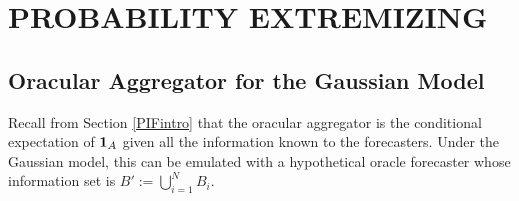 \documentclass[12pt]{article}
\theoremstyle{definition}
\theoremstyle{definition}
\def\one{{\bf 1}}
\begin{document}
%

\section{PROBABILITY EXTREMIZING}
\label{extremizing}
\subsection{Oracular Aggregator for the Gaussian Model}
\label{oracular}
Recall from Section \ref{PIFintro} that the oracular aggregator is the
conditional expectation of $\one_A$ given all the information known to the
forecasters. Under the Gaussian model, this can be
emulated with a hypothetical oracle forecaster whose information set is
$B' := \bigcup_{i=1}^N B_i$.  
\end{document}
